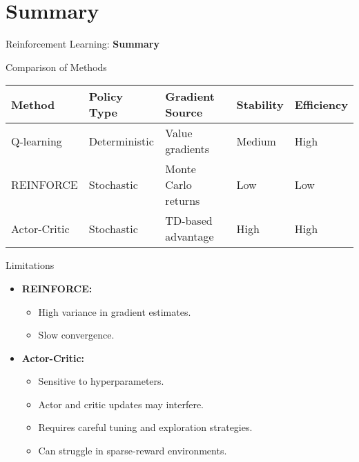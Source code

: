 \section{Summary}
\begin{frame}{}
    \LARGE Reinforcement Learning: \textbf{Summary}
\end{frame}

\begin{frame}{Comparison of Methods}
    \begin{table}[]
        \centering
        \renewcommand{\arraystretch}{2.5}
        \begin{tabular}{lllll}
            \hline
            \textbf{Method} & \textbf{Policy Type} & \textbf{Gradient Source} & \textbf{Stability} & \textbf{Efficiency} \\
            \hline
            Q-learning    & Deterministic & Value gradients         & Medium & High \\
            REINFORCE     & Stochastic    & Monte Carlo returns     & Low    & Low  \\
            Actor-Critic  & Stochastic    & TD-based advantage      & High   & High \\
            \hline
        \end{tabular}
    \end{table}
\end{frame}

\begin{frame}{Limitations}
    \begin{itemize}
        \item \textbf{REINFORCE:}
        \begin{itemize}
            \item High variance in gradient estimates.
            \item Slow convergence.
        \end{itemize}
        \item \textbf{Actor-Critic:}
        \begin{itemize}
            \item Sensitive to hyperparameters.
            \item Actor and critic updates may interfere.
            \item Requires careful tuning and exploration strategies.
            \item Can struggle in sparse-reward environments.
        \end{itemize}
    \end{itemize}
\end{frame}

